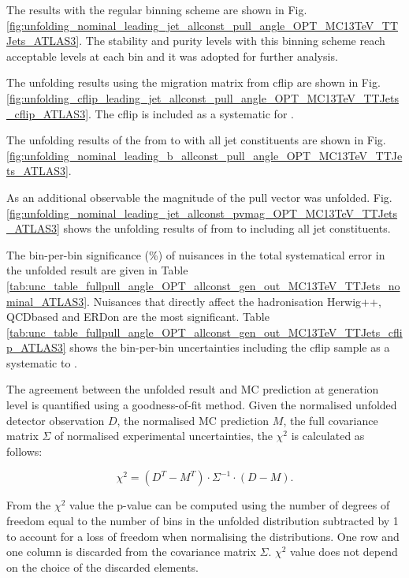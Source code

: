 The results with the regular binning scheme are shown in Fig. \ref{fig:unfolding_nominal_leading_jet_allconst_pull_angle_OPT_MC13TeV_TTJets_ATLAS3}. The stability and purity levels with this binning scheme reach acceptable levels at each bin and it was adopted for further analysis.

The unfolding results using the migration matrix from \ttbar cflip are shown in Fig. \ref{fig:unfolding_cflip_leading_jet_allconst_pull_angle_OPT_MC13TeV_TTJets_cflip_ATLAS3}. The \ttbar cflip is included as a systematic for \ttbar.

The unfolding results of the \pullangle from \leadingb to \scndleadingb with all jet constituents are shown in Fig. \ref{fig:unfolding_nominal_leading_b_allconst_pull_angle_OPT_MC13TeV_TTJets_ATLAS3}.

As an additional observable the magnitude of the pull vector \pvmag was unfolded. Fig. \ref{fig:unfolding_nominal_leading_jet_allconst_pvmag_OPT_MC13TeV_TTJets_ATLAS3} shows the unfolding results of \pvmag from \leadingjet to \scndleadingjet including all jet constituents.

The bin-per-bin significance (\%) of nuisances in the total systematical error in the unfolded result are given in Table \ref{tab:unc_table_fullpull_angle_OPT_allconst_gen_out_MC13TeV_TTJets_nominal_ATLAS3}. Nuisances that directly affect the hadronisation \ttbar Herwig++, \ttbar QCDbased and \ttbar ERDon are the most significant. Table \ref{tab:unc_table_fullpull_angle_OPT_allconst_gen_out_MC13TeV_TTJets_cflip_ATLAS3} shows the bin-per-bin uncertainties including the \ttbar cflip sample as a systematic to \ttbar.

The agreement between the unfolded result and MC prediction at generation level is quantified using a goodness-of-fit method. Given the normalised unfolded detector observation $D$, the normalised MC prediction $M$, the full covariance matrix $\Sigma$ of normalised experimental uncertainties, the $\chi^{2}$ is calculated as follows:

\begin{equation}
  \chi^{2}=(D^{T}-M^{T})\cdot\Sigma^{-1}\cdot(D-M).
  \label{eq:chi2}
\end{equation}

From the $\chi^{2}$ value the p-value can be computed using the number of degrees of freedom equal to the number of bins in the unfolded distribution subtracted by 1 to account for a loss of freedom when normalising the distributions. One row and one column is discarded from the covariance matrix $\Sigma$. $\chi^{2}$ value does not depend on the choice of the discarded elements.

